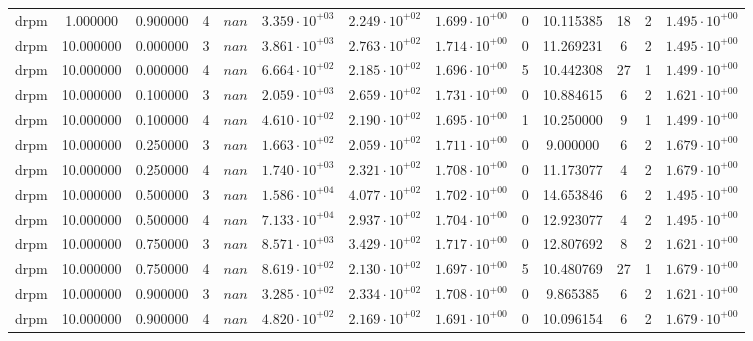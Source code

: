 \begin{table}
\begin{tabular}{ccccccccccccc}
drpm & 1.000000 & 0.900000 & 4 & $nan$ & $3.359 \cdot 10^{+03}$ & $2.249 \cdot 10^{+02}$ & $1.699 \cdot 10^{+00}$ & 0 & 10.115385 & 18 & 2 & $1.495 \cdot 10^{+00}$ \\
drpm & 10.000000 & 0.000000 & 3 & $nan$ & $3.861 \cdot 10^{+03}$ & $2.763 \cdot 10^{+02}$ & $1.714 \cdot 10^{+00}$ & 0 & 11.269231 & 6 & 2 & $1.495 \cdot 10^{+00}$ \\
drpm & 10.000000 & 0.000000 & 4 & $nan$ & $6.664 \cdot 10^{+02}$ & $2.185 \cdot 10^{+02}$ & $1.696 \cdot 10^{+00}$ & 5 & 10.442308 & 27 & 1 & $1.499 \cdot 10^{+00}$ \\
drpm & 10.000000 & 0.100000 & 3 & $nan$ & $2.059 \cdot 10^{+03}$ & $2.659 \cdot 10^{+02}$ & $1.731 \cdot 10^{+00}$ & 0 & 10.884615 & 6 & 2 & $1.621 \cdot 10^{+00}$ \\
drpm & 10.000000 & 0.100000 & 4 & $nan$ & $4.610 \cdot 10^{+02}$ & $2.190 \cdot 10^{+02}$ & $1.695 \cdot 10^{+00}$ & 1 & 10.250000 & 9 & 1 & $1.499 \cdot 10^{+00}$ \\
drpm & 10.000000 & 0.250000 & 3 & $nan$ & $1.663 \cdot 10^{+02}$ & $2.059 \cdot 10^{+02}$ & $1.711 \cdot 10^{+00}$ & 0 & 9.000000 & 6 & 2 & $1.679 \cdot 10^{+00}$ \\
drpm & 10.000000 & 0.250000 & 4 & $nan$ & $1.740 \cdot 10^{+03}$ & $2.321 \cdot 10^{+02}$ & $1.708 \cdot 10^{+00}$ & 0 & 11.173077 & 4 & 2 & $1.679 \cdot 10^{+00}$ \\
drpm & 10.000000 & 0.500000 & 3 & $nan$ & $1.586 \cdot 10^{+04}$ & $4.077 \cdot 10^{+02}$ & $1.702 \cdot 10^{+00}$ & 0 & 14.653846 & 6 & 2 & $1.495 \cdot 10^{+00}$ \\
drpm & 10.000000 & 0.500000 & 4 & $nan$ & $7.133 \cdot 10^{+04}$ & $2.937 \cdot 10^{+02}$ & $1.704 \cdot 10^{+00}$ & 0 & 12.923077 & 4 & 2 & $1.495 \cdot 10^{+00}$ \\
drpm & 10.000000 & 0.750000 & 3 & $nan$ & $8.571 \cdot 10^{+03}$ & $3.429 \cdot 10^{+02}$ & $1.717 \cdot 10^{+00}$ & 0 & 12.807692 & 8 & 2 & $1.621 \cdot 10^{+00}$ \\
drpm & 10.000000 & 0.750000 & 4 & $nan$ & $8.619 \cdot 10^{+02}$ & $2.130 \cdot 10^{+02}$ & $1.697 \cdot 10^{+00}$ & 5 & 10.480769 & 27 & 1 & $1.679 \cdot 10^{+00}$ \\
drpm & 10.000000 & 0.900000 & 3 & $nan$ & $3.285 \cdot 10^{+02}$ & $2.334 \cdot 10^{+02}$ & $1.708 \cdot 10^{+00}$ & 0 & 9.865385 & 6 & 2 & $1.621 \cdot 10^{+00}$ \\
drpm & 10.000000 & 0.900000 & 4 & $nan$ & $4.820 \cdot 10^{+02}$ & $2.169 \cdot 10^{+02}$ & $1.691 \cdot 10^{+00}$ & 0 & 10.096154 & 6 & 2 & $1.679 \cdot 10^{+00}$ \\

\end{tabular}
\end{table}
